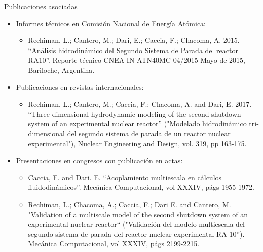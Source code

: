 \documentclass[12pt,screen,twoside,pagebackref]{ibtesis}
\begin{document}

\appendix




\begin{biblio}

\end{biblio}


\begin{postliminary}

\begin{seccion}{Publicaciones asociadas}
\begin{itemize}

\item Informes técnicos en Comisión Nacional de Energía Atómica:
\begin{itemize}
\item Rechiman, L.; Cantero, M.; Dari, E.; Caccia, F.; Chacoma, A. 2015. “Análisis hidrodinámico del Segundo Sistema de Parada del reactor RA10”. Reporte técnico CNEA IN-ATN40MC-04/2015 Mayo de 2015, Bariloche, Argentina.
\end{itemize}

\item Publicaciones en revistas internacionales:
\begin{itemize}
\item Rechiman, L.; Cantero, M.; Caccia, F.; Chacoma, A. and Dari, E. 2017. “Three-dimensional hydrodynamic modeling of the second shutdown system of an experimental nuclear reactor” ("Modelado hidrodinámico tri-dimensional del segundo sistema de parada de un reactor nuclear experimental"), Nuclear Engineering and Design, vol. 319, pp 163-175.
\end{itemize}

\item Presentaciones en congresos con publicación en actas:
\begin{itemize}
\item Caccia, F. and Dari. E. “Acoplamiento multiescala en cálculos fluidodinámicos”. Mecánica Computacional, vol XXXIV, págs 1955-1972.

\item Rechiman, L.; Chacoma, A.; Caccia, F.; Dari E. and Cantero, M. "Validation of a multiscale model of the second shutdown system of an experimental nuclear reactor“ ("Validación del modelo multiescala del segundo sistema de parada del reactor nuclear experimental RA-10”). Mecánica Computacional, vol XXXIV, págs 2199-2215.
\end{itemize}

\end{itemize}
\end{seccion}


\end{postliminary}
\end{document}
